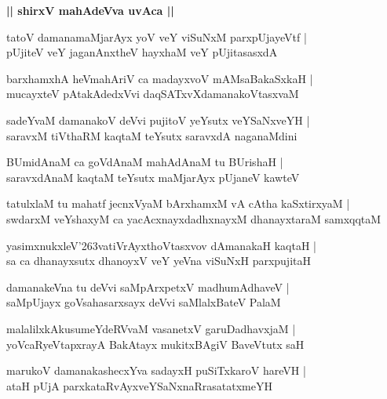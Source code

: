 \documentclass[twoside,12pt,openright]{book}
\def\S{\char'263}
\newcounter{shloka}[chapter]
\def\uvaca#1{\centerline{{\large\textbf{#1}}}}
\begin{document}
\uvaca{|| shirxV mahAdeVva uvAca ||}

\begin{shloka}%
tatoV damanamaMjarAyx yoV veY viSuNxM parxpUjayeVtf |\\
pUjiteV veY jaganAnxtheV hayxhaM veY pUjitasasxdA 
\end{shloka}

\begin{shloka}%
barxhamxhA heVmahAriV ca madayxvoV mAMsaBakaSxkaH |\\
mucayxteV pAtakAdedxVvi daqSATxvXdamanakoVtasxvaM 
\end{shloka}

\begin{shloka}%
sadeYvaM damanakoV deVvi pujitoV yeYsutx veYSaNxveYH |\\
saravxM tiVthaRM kaqtaM teYsutx saravxdA naganaMdini
\end{shloka}

\begin{shloka}%
BUmidAnaM ca goVdAnaM mahAdAnaM tu BUrishaH |\\
saravxdAnaM kaqtaM teYsutx maMjarAyx pUjaneV kawteV 
\end{shloka}

\begin{shloka}%
tatulxlaM tu mahatf jecnxVyaM bArxhamxM vA cAtha kaSxtirxyaM |\\
swdarxM veYshaxyM ca yacAcxnayxdadhxnayxM dhanayxtaraM samxqqtaM 
\end{shloka}

\begin{shloka}%
yasimxnukxleV\S vatiVrAyxthoVtasxvov dAmanakaH kaqtaH |\\
sa ca dhanayxsutx dhanoyxV veY yeVna viSuNxH parxpujitaH 
\end{shloka}

\begin{shloka}%
damanakeVna tu deVvi saMpArxpetxV madhumAdhaveV |\\
saMpUjayx goVsahasarxsayx deVvi saMlalxBateV PalaM
\end{shloka}

\begin{shloka}%
malalilxkAkusumeYdeRVvaM vasanetxV garuDadhavxjaM |\\
yoVcaRyeVtapxrayA BakAtayx mukitxBAgiV BaveVtutx saH
\end{shloka}

\begin{shloka}%
marukoV damanakashecxYva sadayxH puSiTxkaroV hareVH |\\
ataH pUjA parxkataRvAyxveYSaNxnaRrasatatxmeYH 
\end{shloka}
\end{document}
